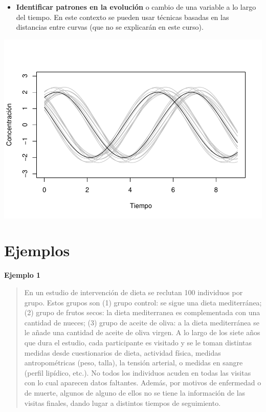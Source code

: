 \documentclass[
]{book}
\providecommand{\tightlist}{%
  \setlength{\itemsep}{0pt}\setlength{\parskip}{0pt}}
\begin{document}
\begin{itemize}
\tightlist
\item
  \textbf{Identificar patrones en la evolución} o cambio de una variable a lo largo del tiempo. En este contexto se pueden usar técnicas basadas en las distancias entre curvas (que no se explicarán en este curso).
\end{itemize}

\includegraphics{fig_out/unnamed-chunk-4-1.pdf}

\hypertarget{ejemplos}{%
\section{Ejemplos}\label{ejemplos}}

\textbf{Ejemplo 1}

\begin{quote}
En un estudio de intervención de dieta se reclutan 100 individuos por grupo. Estos grupos son (1) grupo control: se sigue una dieta mediterránea; (2) grupo de frutos secos: la dieta mediterranea es complementada con una cantidad de nueces; (3) grupo de aceite de oliva: a la dieta mediterránea se le añade una cantidad de aceite de oliva virgen.
A lo largo de los siete años que dura el estudio, cada participante es visitado y se le toman distintas medidas desde cuestionarios de dieta, actividad física, medidas antropométricas (peso, talla), la tensión arterial, o medidas en sangre (perfil lipídico, etc.).
No todos los individuos acuden en todas las visitas con lo cual aparecen datos faltantes. Además, por motivos de enfermedad o de muerte, algunos de alguno de ellos no se tiene la información de las visitas finales, dando lugar a distintos tiempos de seguimiento.
\end{quote}
\end{document}
